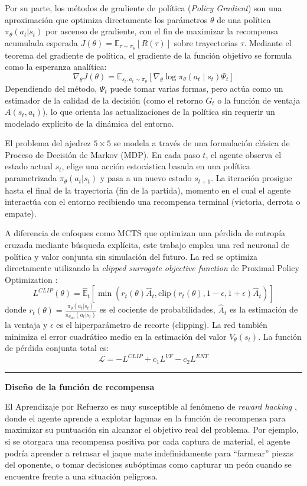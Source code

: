 \documentclass[12pt, a4paper]{article}
\let\cite\supercite
\begin{document}
Por su parte, los métodos de gradiente de política (\textit{Policy Gradient}) son una aproximación que optimiza directamente los parámetros $\theta$ de una política $\pi_\theta(a_t|s_t)$ por ascenso de gradiente, con el fin de maximizar la recompensa acumulada esperada $J(\theta) = \mathbb{E}_{\tau \sim \pi_\theta} [R(\tau)]$ sobre trayectorias $\tau$. Mediante el teorema del gradiente de política, el gradiente de la función objetivo se formula como la esperanza analítica:
$$\nabla_\theta J(\theta) = \mathbb{E}_{s_t, a_t \sim \pi_\theta} \left[ \nabla_\theta \log \pi_\theta(a_t \mid s_t) \Psi_t \right]$$
Dependiendo del método, $\Psi_t$ puede tomar varias formas, pero actúa como un estimador de la calidad de la decisión (como el retorno $G_t$ o la función de ventaja $A(s_t, a_t)$), lo que orienta las actualizaciones de la política sin requerir un modelado explícito de la dinámica del entorno.

El problema del ajedrez $5\times5$ se modela a través de una formulación clásica de Proceso de Decisión de Markov (MDP). En cada paso $t$, el agente observa el estado actual $s_t$, elige una acción estocástica basada en una política parametrizada $\pi_\theta(a_t|s_t)$ y pasa a un nuevo estado $s_{t+1}$. La iteración prosigue hasta el final de la trayectoria (fin de la partida), momento en el cual el agente interactúa con el entorno recibiendo una recompensa terminal (victoria, derrota o empate).

A diferencia de enfoques como MCTS que optimizan una pérdida de entropía cruzada mediante búsqueda explícita, este trabajo emplea una red neuronal de política y valor conjunta sin simulación del futuro. La red se optimiza directamente utilizando la \textit{clipped surrogate objective function} de Proximal Policy Optimization \cite{DBLP:journals/corr/SchulmanWDRK17}:
$$L^{CLIP}(\theta) = \hat{\mathbb{E}}_t \left[ \min(r_t(\theta)\hat{A}_t, \text{clip}(r_t(\theta), 1-\epsilon, 1+\epsilon)\hat{A}_t) \right]$$
donde $r_t(\theta) = \frac{\pi_\theta(a_t|s_t)}{\pi_{\theta_{\text{old}}}(a_t|s_t)}$ es el cociente de probabilidades, $\hat{A}_t$ es la estimación de la ventaja y $\epsilon$ es el hiperparámetro de recorte (clipping). La red también minimiza el error cuadrático medio en la estimación del valor $V_\theta(s_t)$. La función de pérdida conjunta total es:
$$\mathcal{L}= -L^{CLIP} + c_1 L^{VF}-c_2 L^{ENT}$$

\rule{\textwidth}{0.2pt}
\textbf{Diseño de la función de recompensa}

El Aprendizaje por Refuerzo es muy susceptible al fenómeno de \textit{reward hacking} \cite{weng2024rewardhacking}, donde el agente aprende a explotar lagunas en la función de recompensa para maximizar su puntuación sin alcanzar el objetivo real del problema. Por ejemplo, si se otorgara una recompensa positiva por cada captura de material, el agente podría aprender a retrasar el jaque mate indefinidamente para ``farmear'' piezas del oponente, o tomar decisiones subóptimas como capturar un peón cuando se encuentre frente a una situación peligrosa.
\end{document}

